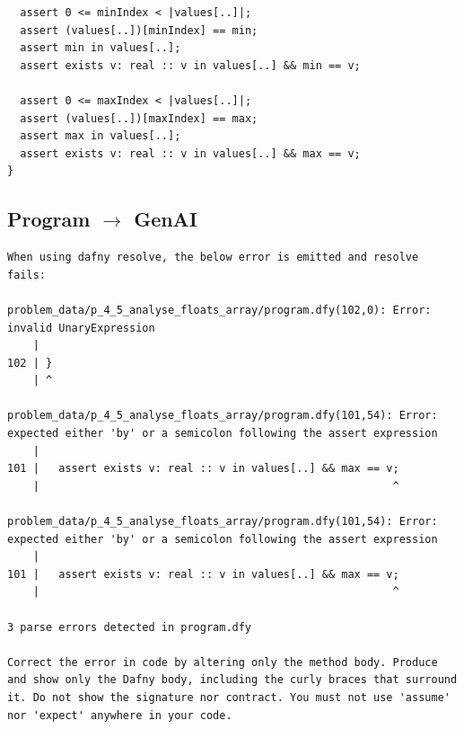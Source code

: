 \documentclass{article}
\begin{document}
\begin{lstlisting}
  assert 0 <= minIndex < |values[..]|;
  assert (values[..])[minIndex] == min;
  assert min in values[..];
  assert exists v: real :: v in values[..] && min == v;

  assert 0 <= maxIndex < |values[..]|;
  assert (values[..])[maxIndex] == max;
  assert max in values[..];
  assert exists v: real :: v in values[..] && max == v;
}
\end{lstlisting}
\subsection*{Program $\rightarrow$ GenAI}
\begin{lstlisting}
When using dafny resolve, the below error is emitted and resolve fails:

problem_data/p_4_5_analyse_floats_array/program.dfy(102,0): Error: invalid UnaryExpression
    |
102 | }
    | ^

problem_data/p_4_5_analyse_floats_array/program.dfy(101,54): Error: expected either 'by' or a semicolon following the assert expression
    |
101 |   assert exists v: real :: v in values[..] && max == v;
    |                                                       ^

problem_data/p_4_5_analyse_floats_array/program.dfy(101,54): Error: expected either 'by' or a semicolon following the assert expression
    |
101 |   assert exists v: real :: v in values[..] && max == v;
    |                                                       ^

3 parse errors detected in program.dfy

Correct the error in code by altering only the method body. Produce and show only the Dafny body, including the curly braces that surround it. Do not show the signature nor contract. You must not use 'assume' nor 'expect' anywhere in your code.
\end{lstlisting}
\end{document}
